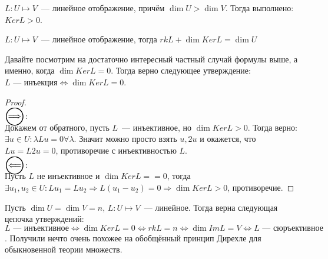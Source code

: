 \begin{follow}
    $L: U\mapsto V$~--- линейное отображение, причём $\dim U > \dim V$.
    Тогда выполнено:  $Ker L > 0$.\\
\end{follow}
\begin{follow}
    $L: U\mapsto V$~--- линейное отображение, тогда $rk L + \dim Ker L = \dim U$
\end{follow}
\begin{remark}
    Давайте посмотрим на достаточно интересный частный случай формулы выше, а именно, когда
    $\dim Ker L = 0$. Тогда верно следующее утверждение: $L\text{~--- инъекция} \Leftrightarrow \dim Ker L = 0$.
\end{remark}
\begin{proof}\leavevmode\\
    $\ora$:\\
        Докажем от обратного, пусть $L$~--- инъективное, но $\dim Ker L > 0$.
        Тогда верно: $\exists u\in U\colon \lambda Lu = 0 \forall \lambda$.
        Значит можно просто взять $u, 2u$ и окажется, что  $Lu = L2u = 0$, 
        противоречие с инъективностью $L$.
    \\$\ola$:\\
        Пусть $L$ не инъективное и $\dim Ker L == 0$, тогда $\exists u_1, u_2\in U\colon Lu_1 = Lu_2\Rightarrow
        L(u_1 - u_2) = 0 \Rightarrow \dim Ker L > 0$, противоречие. 
\end{proof} 
\begin{follow}
    \label{принцип Дирехле}
    Пусть $\dim U = \dim V = n$, $L: U\mapsto V$~--- линейное.
    Тогда верна следующая цепочка утверждений:
    $$L\text{~--- инъективное} \Leftrightarrow \dim Ker L = 0 \Leftrightarrow rk L = n \Leftrightarrow 
    \dim Im L = V \Leftrightarrow L\text{~--- сюръективное}$$.
    Получили нечто очень похожее на обобщённый принцип Дирехле для обыкновенной теории множеств.
\end{follow}

